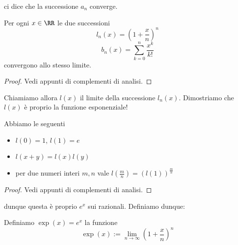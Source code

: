 \documentclass[11pt]{scrartcl}
\begin{document}
	ci dice che la successione $a_n$ converge.
	\begin{proposition}
		Per ogni $x\in \RR$ le due successioni
		$$l_n(x)=\left(1+\frac{x}{n}\right)^n$$
		$$b_n(x)=\sum_{k=0}^n\frac{x^k}{k!}$$
		convergono allo stesso limite.
	\end{proposition}
	\begin{proof}
		Vedi appunti di complementi di analisi.
	\end{proof}
	Chiamiamo allora $l(x)$ il limite della successione $l_n(x)$. Dimostriamo che $l(x)$ è proprio la funzione esponenziale!
	\begin{proposition}
		Abbiamo le seguenti
		\begin{itemize}
			\item $l(0)=1$, $l(1)=e$
			\item $l(x+y)=l(x)l(y)$
			\item per due numeri interi $m,n$ vale $l(\frac{m}{n})=\left(l(1)\right)^{\frac{m}{n}}$
		\end{itemize}
	\end{proposition}
	\begin{proof}
		Vedi appunti di complementi di analisi.
	\end{proof}
	dunque questa è proprio $e^x$ sui razionali. Definiamo dunque:
	\begin{definition}
		Definiamo $\exp(x)=e^x$ la funzione
		$$\exp(x):=\lim_{n\to\infty}\left(1+\frac{x}{n}\right)^n$$
	\end{definition}
	
\end{document}
